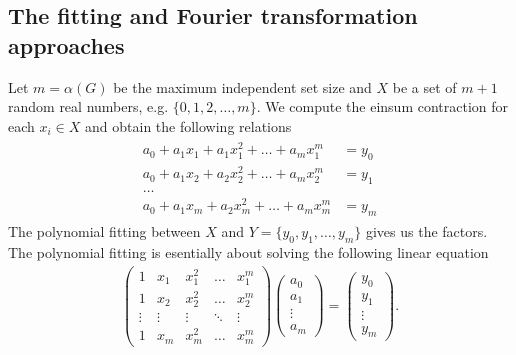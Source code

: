 \documentclass{article}
\newcommand{\<}{\langle}
\renewcommand{\>}{\rangle}
\theoremstyle{definition}\newtheorem{definition}{\textit{Definition}}
\begin{document}
\subsection{The fitting and Fourier transformation approaches}
Let $m=\alpha(G)$ be the maximum independent set size and $X$ be a set of $m+1$ random real numbers, e.g. $\{0, 1, 2, \ldots, m\}$.
We compute the einsum contraction for each $x_i \in X$ and obtain the following relations
\begin{align}
    \begin{split}
a_0 + a_1 x_1 + a_1 x_1^2 + \ldots + a_m x_1^m &= y_0\\
a_0 + a_1 x_2 + a_2 x_2^2 + \ldots + a_m x_2^m &= y_1\\
\ldots&\\
a_0 + a_1 x_m + a_2 x_m^2 + \ldots + a_m x_m^m& = y_m
    \end{split}
\end{align}
The polynomial fitting between $X$ and $Y = \{y_0, y_1, \ldots, y_m\}$ gives us the factors.
The polynomial fitting is esentially about solving the following linear equation
\begin{align}
\left(\begin{matrix}
1 & x_1 & x_1^2 & \ldots & x_1^m \\
1 & x_2 & x_2^2 & \ldots & x_2^m \\
\vdots & \vdots & \vdots &\ddots & \vdots \\
1 & x_m & x_m^2 & \ldots & x_m^m
\end{matrix}\right)
\left(\begin{matrix}
a_0 \\ a_1 \\ \vdots \\ a_m
\end{matrix}\right)
= \left(\begin{matrix}
y_0 \\ y_1 \\ \vdots \\ y_m
\end{matrix}\right).
\end{align}
\end{document}
